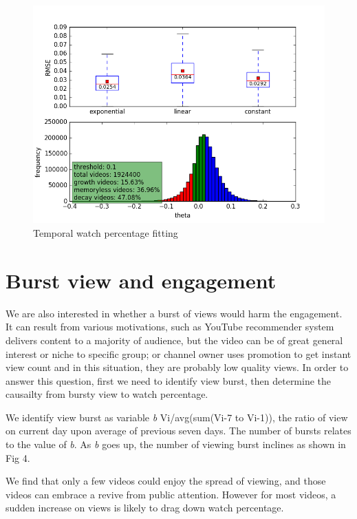 \begin{figure}
    \centering
    \includegraphics[scale=0.45]{image/wp_rmse_comp_and_theta_dist.png}
    \caption{Temporal watch percentage fitting}
\end{figure}

\section{Burst view and engagement}

We are also interested in whether a burst of views would harm the engagement. It can result from various motivations, such as YouTube recommender system delivers content to a majority of audience, but the video can be of great general interest or niche to specific group; or channel owner uses promotion to get instant view count and in this situation, they are probably low quality views. In order to answer this question, first we need to identify view burst, then determine the causailty from bursty view to watch percentage.

We identify view burst as variable \textit{b} Vi/avg(sum(Vi-7 to Vi-1)), the ratio of view on current day upon average of previous seven days. The number of bursts relates to the value of \textit{b}. As \textit{b} goes up, the number of viewing burst inclines as shown in Fig 4.

We find that only a few videos could enjoy the spread of viewing, and those videos can embrace a revive from public attention. However for most videos, a sudden increase on views is likely to drag down watch percentage.

